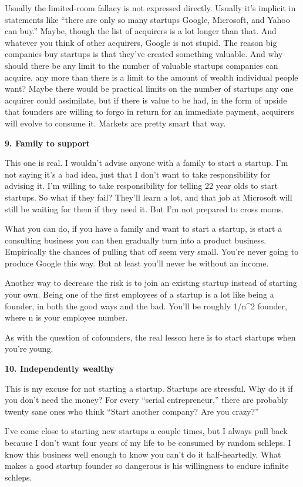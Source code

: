 Usually the limited-room fallacy is not expressed directly. Usually it's
implicit in statements like ``there are only so many startups Google,
Microsoft, and Yahoo can buy.'' Maybe, though the list of acquirers is a
lot longer than that. And whatever you think of other acquirers, Google
is not stupid. The reason big companies buy startups is that they've
created something valuable. And why should there be any limit to the
number of valuable startups companies can acquire, any more than there
is a limit to the amount of wealth individual people want? Maybe there
would be practical limits on the number of startups any one acquirer
could assimilate, but if there is value to be had, in the form of upside
that founders are willing to forgo in return for an immediate payment,
acquirers will evolve to consume it. Markets are pretty smart that way.

\textbf{9. Family to support}

This one is real. I wouldn't advise anyone with a family to start a
startup. I'm not saying it's a bad idea, just that I don't want to take
responsibility for advising it. I'm willing to take responsibility for
telling 22 year olds to start startups. So what if they fail? They'll
learn a lot, and that job at Microsoft will still be waiting for them if
they need it. But I'm not prepared to cross moms.

What you can do, if you have a family and want to start a startup, is
start a consulting business you can then gradually turn into a product
business. Empirically the chances of pulling that off seem very small.
You're never going to produce Google this way. But at least you'll never
be without an income.

Another way to decrease the risk is to join an existing startup instead
of starting your own. Being one of the first employees of a startup is a
lot like being a founder, in both the good ways and the bad. You'll be
roughly 1/n\^{}2 founder, where n is your employee number.

As with the question of cofounders, the real lesson here is to start
startups when you're young.

\textbf{10. Independently wealthy}

This is my excuse for not starting a startup. Startups are stressful.
Why do it if you don't need the money? For every ``serial
entrepreneur,'' there are probably twenty sane ones who think ``Start
another company? Are you crazy?''

I've come close to starting new startups a couple times, but I always
pull back because I don't want four years of my life to be consumed by
random schleps. I know this business well enough to know you can't do it
half-heartedly. What makes a good startup founder so dangerous is his
willingness to endure infinite schleps.

